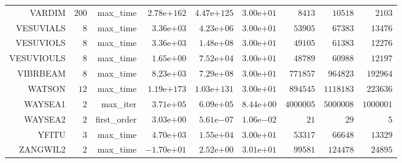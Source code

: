 \begin{longtable}{rrrrrrrrr}
VARDIM & \(   200\) & max\_time & \(2.78\)e\(+162\) & \(4.47\)e\(+125\) & \( 3.00\)e\(+01\) & \(  8413\) & \( 10518\) & \(  2103\) \\
VESUVIALS & \(     8\) & max\_time & \( 3.36\)e\(+03\) & \( 4.23\)e\(+06\) & \( 3.00\)e\(+01\) & \( 53905\) & \( 67383\) & \( 13476\) \\
VESUVIOLS & \(     8\) & max\_time & \( 3.36\)e\(+03\) & \( 1.48\)e\(+08\) & \( 3.00\)e\(+01\) & \( 49105\) & \( 61383\) & \( 12276\) \\
VESUVIOULS & \(     8\) & max\_time & \( 1.65\)e\(+00\) & \( 7.52\)e\(+04\) & \( 3.00\)e\(+01\) & \( 48789\) & \( 60988\) & \( 12197\) \\
VIBRBEAM & \(     8\) & max\_time & \( 8.23\)e\(+03\) & \( 7.29\)e\(+08\) & \( 3.00\)e\(+01\) & \(771857\) & \(964823\) & \(192964\) \\
WATSON & \(    12\) & max\_time & \(1.19\)e\(+173\) & \(1.03\)e\(+131\) & \( 3.00\)e\(+01\) & \(894545\) & \(1118183\) & \(223636\) \\
WAYSEA1 & \(     2\) & max\_iter & \( 3.71\)e\(+05\) & \( 6.09\)e\(+05\) & \( 8.44\)e\(+00\) & \(4000005\) & \(5000008\) & \(1000001\) \\
WAYSEA2 & \(     2\) & first\_order & \( 3.03\)e\(+00\) & \( 5.61\)e\(-07\) & \( 1.06\)e\(-02\) & \(    21\) & \(    29\) & \(     5\) \\
YFITU & \(     3\) & max\_time & \( 4.70\)e\(+03\) & \( 1.55\)e\(+04\) & \( 3.00\)e\(+01\) & \( 53317\) & \( 66648\) & \( 13329\) \\
ZANGWIL2 & \(     2\) & max\_time & \(-1.70\)e\(+01\) & \( 2.52\)e\(+00\) & \( 3.01\)e\(+01\) & \( 99581\) & \(124478\) & \( 24895\) \\\hline
\end{longtable}
